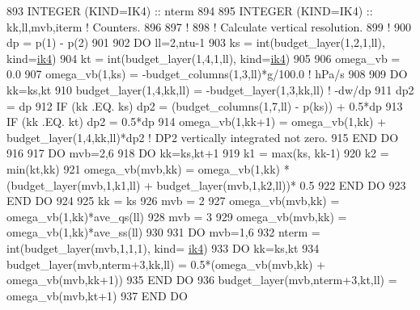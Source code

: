 \begin{DoxyCode}
893 \textcolor{keywordtype}{INTEGER (KIND=IK4)}                                                  :: nterm
894 
895 \textcolor{keywordtype}{INTEGER (KIND=IK4)}                                                  :: kk,ll,mvb,iterm  \textcolor{comment}{! Counters.}
896 
897 \textcolor{comment}{!}
898 \textcolor{comment}{! Calculate vertical resolution.}
899 \textcolor{comment}{!}
900 dp  = p(1) - p(2)
901 
902 \textcolor{keywordflow}{DO} ll=2,ntu-1
903     ks  = int(budget\_layer(1,2,1,ll), kind=\hyperlink{namespaceportable_aa110cf333432508140602ea192c4b2ea}{ik4})
904     kt  = int(budget\_layer(1,4,1,ll), kind=\hyperlink{namespaceportable_aa110cf333432508140602ea192c4b2ea}{ik4})
905 
906     omega\_vb = 0.0
907     omega\_vb(1,ks)  = -budget\_columns(1,3,ll)*\hyperlink{namespaceconstants_a046aef138fbc8d05251d4fdc6eb3ee89}{g}/100.0                                   \textcolor{comment}{! hPa/s}
908 
909     \textcolor{keywordflow}{DO} kk=ks,kt
910         budget\_layer(1,4,kk,ll) = -budget\_layer(1,3,kk,ll)                              \textcolor{comment}{! -dw/dp}
911         dp2                     = dp
912         \textcolor{keywordflow}{IF} (kk .EQ. ks) dp2     = (budget\_columns(1,7,ll) - p(ks)) + 0.5*dp
913         \textcolor{keywordflow}{IF} (kk .EQ. kt) dp2     = 0.5*dp
914         omega\_vb(1,kk+1)        = omega\_vb(1,kk) + budget\_layer(1,4,kk,ll)*dp2          \textcolor{comment}{! DP2 vertically
       integrated not zero.}
915 \textcolor{keywordflow}{    END DO}
916 
917     \textcolor{keywordflow}{DO} mvb=2,6
918         \textcolor{keywordflow}{DO} kk=ks,kt+1
919             k1                  = max(ks, kk-1)
920             k2                  = min(kt,kk)
921             omega\_vb(mvb,kk)    = omega\_vb(1,kk) * (budget\_layer(mvb,1,k1,ll) + budget\_layer(mvb,1,k2,ll))*
      0.5
922 \textcolor{keywordflow}{        END DO}
923 \textcolor{keywordflow}{    END DO}
924 
925     kk                  = ks
926     mvb                 = 2
927     omega\_vb(mvb,kk)    = omega\_vb(1,kk)*ave\_qs(ll)
928     mvb                 = 3
929     omega\_vb(mvb,kk)    = omega\_vb(1,kk)*ave\_ss(ll)
930 
931     \textcolor{keywordflow}{DO} mvb=1,6
932         nterm                               = int(budget\_layer(mvb,1,1,1), kind=
      \hyperlink{namespaceportable_aa110cf333432508140602ea192c4b2ea}{ik4})
933         \textcolor{keywordflow}{DO} kk=ks,kt
934             budget\_layer(mvb,nterm+3,kk,ll) = 0.5*(omega\_vb(mvb,kk) + omega\_vb(mvb,kk+1))
935 \textcolor{keywordflow}{        END DO}
936         budget\_layer(mvb,nterm+3,kt,ll)     = omega\_vb(mvb,kt+1)
937 \textcolor{keywordflow}{    END DO}

\end{DoxyCode}
